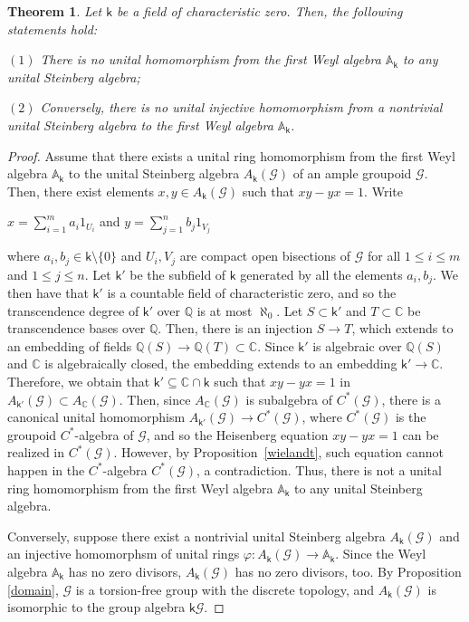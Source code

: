 \documentclass[a4paper, 11pt, reqno]{amsart}
\newtheorem{thm}{Theorem}[section]
\theoremstyle{definition}
\let\phi\varphi
\def\mG{\mathcal{G}}
\newcommand{\K}{\mathsf{k}}
\begin{document}
\begin{thm}\label{main}
Let $\K$ be a field of characteristic zero. Then, the following statements hold:

$(1)$ There is no unital homomorphism from the first Weyl algebra $\mathbb A_\K$ to any unital Steinberg algebra;

$(2)$ Conversely, there is no unital injective homomorphism from a nontrivial unital Steinberg algebra to the first  Weyl algebra $\mathbb A_\K$. 
\end{thm}
\begin{proof}
Assume that there exists a unital ring homomorphism from the first Weyl algebra $\mathbb A_\K$ to the unital Steinberg algebra	$A_\K(\mG)$ of an ample groupoid $\mG$. Then, there exist elements $x, y\in A_\K(\mG)$ such that $xy-yx=1$. Write

\begin{center}
$x = \sum^m_{i=1}a_i1_{U_i}$ and  $y = \sum^n_{j=1}b_j 1_{V_j}$
\end{center}
where $a_i, b_j \in \K\setminus \{0\}$ and $U_i, V_j$ are compact open bisections of $\mG$ for all $1\le i\le m$ and $1\le j\le n$. Let $\K'$ be the subfield of $\K$ generated by all the elements $a_i, b_j$. We then have that $\K'$ is a countable field of characteristic zero, and so the transcendence degree of $\K'$ over $\mathbb{Q}$ is at most $\aleph_0$. Let $S \subset \K'$ and $T \subset \mathbb{C}$ be transcendence bases over $\mathbb{Q}$. Then, there is an injection $S\longrightarrow T$, which extends to an embedding of fields $\mathbb{Q}(S)\longrightarrow \mathbb{Q}(T) \subset \mathbb{C}$. Since $\K'$ is algebraic over $\mathbb{Q}(S)$ and $\mathbb{C}$ is algebraically closed, the embedding extends to an embedding $\K' \longrightarrow \mathbb{C}$. Therefore, we obtain that
 $\K'\subseteq \mathbb C\cap \K$ such that  $xy-yx=1$ in $A_{\K'}(\mG)\subset A_{\mathbb{C}}(\mG)$. Then, since 
 $A_{\mathbb{C}}(\mG)$ is subalgebra of $C^*(\mG)$,
 there is a canonical unital homomorphism $A_{\K'}(\mG) \rightarrow C^*(\mG)$, where $C^*(\mG)$ is the groupoid $C^*$-algebra of $\mG$, and so the Heisenberg equation $xy-yx=1$ can be realized in $C^*(\mG)$. However, by Proposition~\ref{wielandt}, such equation cannot happen in the $C^*$-algebra $C^*(\mG)$, a contradiction. Thus, there is not a unital ring homomorphism from the first Weyl algebra $\mathbb A_\K$ to any unital Steinberg algebra. 

Conversely, suppose there exist a nontrivial unital Steinberg algebra $A_\K(\mG)$ and an injective  homomorphsm of unital rings $\phi: A_\K(\mG) \longrightarrow \mathbb A_\K$. Since the Weyl algebra $\mathbb A_\K$ has no zero divisors,  $A_\K(\mG)$  has no zero divisors, too.  By Proposition \ref{domain}, $\mathcal{G}$ is a torsion-free group with the discrete topology, and $A_\K(\mG)$ is isomorphic to the group algebra $\K\mG$. 


\end{proof}
\end{document}
